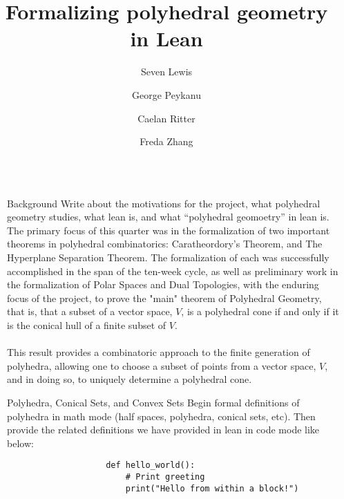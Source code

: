 \documentclass[final]{beamer}
\title{Formalizing polyhedral geometry in Lean}
\author{Seven Lewis \and George Peykanu \and Caelan Ritter \and Freda Zhang}
\institute[]{University of Washington}
\newlength{\sepwidth}
\newlength{\colwidth}
\newcommand{\separatorcolumn}{\begin{column}{\sepwidth}\end{column}}
\begin{document}
\begin{frame}[fragile]
    \begin{columns}[t]
        \separatorcolumn

        \begin{column}{\colwidth}

            \begin{block}{Background}
                Write about the motivations for the project, what polyhedral geometry studies, what lean is, and what ``polyhedral geomoetry'' in lean is. 
                \vspace{20em}
                The primary focus of this quarter was in the formalization of two important theorems in polyhedral combinatorics:
                Caratheordory's Theorem, and The Hyperplane Separation Theorem. The formalization of each was successfully accomplished in the
                span of the ten-week cycle, as well as preliminary work in the formalization of Polar Spaces and Dual Topologies, with the enduring
                focus of the project, to prove the "main" theorem of Polyhedral Geometry, that is, that a subset of a vector space, $V$, is a polyhedral cone
                if and only if it is the conical hull of a finite subset of $V$.
                \\\\This result provides a combinatoric approach to the finite generation of polyhedra, allowing one to choose a subset of points from a vector space,
                $V$, and in doing so, to uniquely determine a polyhedral cone.
                
            \end{block}

            \begin{block}{Polyhedra, Conical Sets, and Convex Sets}
                Begin formal definitions of polyhedra in math mode (half spaces, polyhedra, conical sets, etc). Then provide the related definitions we have provided in lean in code mode like below:

                \begin{verbatim}
                    def hello_world():
                        # Print greeting
                        print("Hello from within a block!")
                \end{verbatim}

                \vspace{30em}
            \end{block}


\end{column}
\end{columns}
\end{frame}
\end{document}
